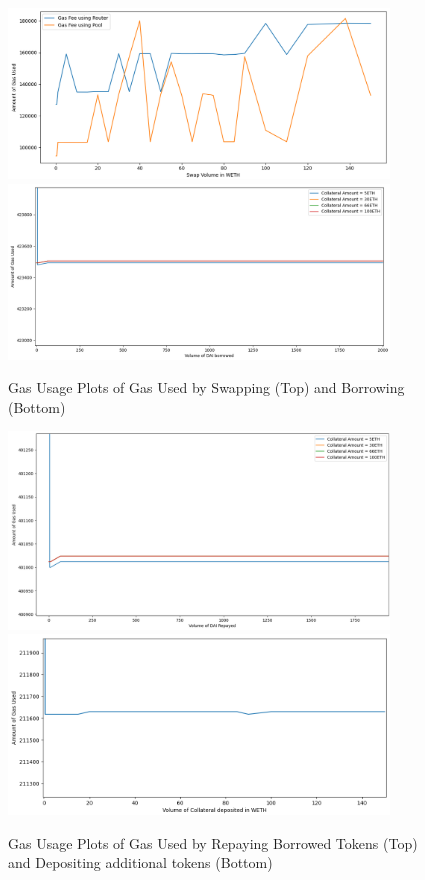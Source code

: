 \begin{figure}[!htb]
    \centering
    \includegraphics[width=0.9\textwidth]{project/Images/SwapFeesPlot.png}\\
    \includegraphics[width=0.9\textwidth]{project/Images/BorrowFees2.png}
    \caption{Gas Usage Plots of Gas Used by Swapping (Top) and Borrowing (Bottom) \label{fig:gasPlots1}}
\end{figure}

\begin{figure}[!htb]
    \centering
    \includegraphics[width=0.9\textwidth]{project/Images/RepayFees2.png}\\
    \includegraphics[width=0.9\textwidth]{project/Images/depositFeesPlot2.png}
    \caption{Gas Usage Plots of Gas Used by Repaying Borrowed Tokens (Top) and Depositing additional tokens (Bottom) \label{fig:gasPlots2}}
\end{figure}

